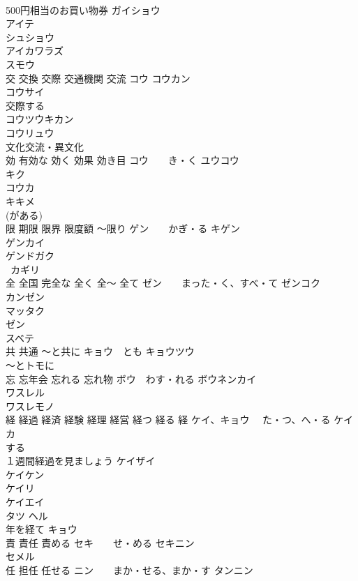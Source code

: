 \documentclass[8pt]{extreport}
\begin{document}
\begin{CJK}{UTF8}{min}
\\	500円相当のお買い物券 ガイショウ 
\\	アイテ 
\\	シュショウ 
\\	アイカワラズ 
\\	スモウ 
\\	交 交換 交際 交通機関 交流	コウ コウカン 
\\	コウサイ 
\\	交際する 
\\	コウツウキカン 
\\	コウリュウ 
\\	文化交流・異文化
\\	効 有効な 効く 効果 効き目	コウ　　き・く ユウコウ 
\\	キク　
\\	コウカ　
\\	キキメ　
\\	(がある)
\\	限 期限 限界 限度額 〜限り	ゲン　　かぎ・る キゲン 
\\	ゲンカイ 
\\	ゲンドガク 
\\	~カギリ 
\\	全 全国 完全な 全く 全〜 全て	ゼン　　まった・く、すべ・て ゼンコク
\\	カンゼン 
\\	マッタク 
\\	ゼン~　
\\	スベテ　
\\	共 共通 〜と共に	キョウ　とも キョウツウ 
\\	〜とトモに 
\\	忘 忘年会 忘れる 忘れ物	ボウ　わす・れる ボウネンカイ 
\\	ワスレル 
\\	ワスレモノ 
\\	経 経過 経済 経験 経理 経営 経つ 経る 経	ケイ、キョウ 　た・つ、へ・る ケイカ 
\\	する
\\	１週間経過を見ましょう ケイザイ　
\\	ケイケン 
\\	ケイリ 
\\	ケイエイ 
\\	タツ ヘル 
\\	年を経て キョウ 
\\	責 責任 責める	セキ　　せ・める セキニン
\\	セメル 
\\	任 担任 任せる	ニン　　まか・せる、まか・す タンニン 

\end{CJK}
\end{document}
